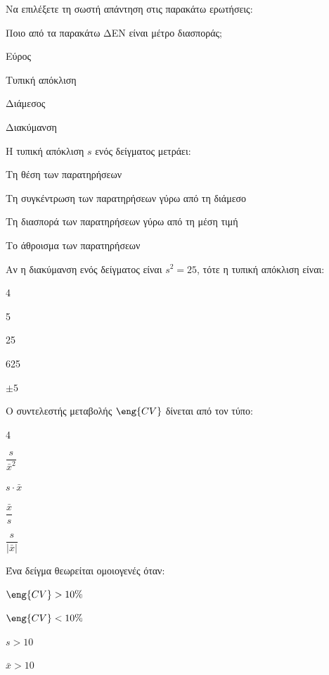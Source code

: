 \documentclass[11pt,a4paper,modern]{FFExercises}
\begin{document}
\askhsh
Να επιλέξετε τη σωστή απάντηση στις παρακάτω ερωτήσεις:
\begin{alist}
    \item Ποιο από τα παρακάτω ΔΕΝ είναι μέτρο διασποράς;
    \begin{alist}
        \item Εύρος
        \item Τυπική απόκλιση
        \item Διάμεσος
        \item Διακύμανση
    \end{alist}
    
    \item Η τυπική απόκλιση $s$ ενός δείγματος μετράει:
    \begin{alist}
        \item Τη θέση των παρατηρήσεων
        \item Τη συγκέντρωση των παρατηρήσεων γύρω από τη διάμεσο
        \item Τη διασπορά των παρατηρήσεων γύρω από τη μέση τιμή
        \item Το άθροισμα των παρατηρήσεων
    \end{alist}
    
    \item Αν η διακύμανση ενός δείγματος είναι $s^2 = 25$, τότε η τυπική απόκλιση είναι:
\begin{multicols}{4}
    \begin{alist}
        \item 5
        \item 25
        \item 625
        \item $\pm 5$
    \end{alist}
\end{multicols}
    
    \item Ο συντελεστής μεταβολής $\eng{CV}$ δίνεται από τον τύπο:
\begin{multicols}{4}
    \begin{alist}[leftmargin=4mm]
        \item $\dfrac{s}{\bar{x}^2}$
        \item $s \cdot \bar{x}$
        \item $\dfrac{\bar{x}}{s}$
        \item $\dfrac{s}{|\bar{x}|}$
    \end{alist}
\end{multicols}
    
    \item Ένα δείγμα θεωρείται ομοιογενές όταν:
    \begin{alist}
        \item $\eng{CV} > 10\%$
        \item $\eng{CV} < 10\%$
        \item $s > 10$
        \item $\bar{x} > 10$
    \end{alist}
\end{alist}
\end{document}
